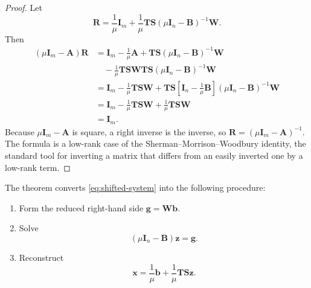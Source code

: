 \documentclass[11pt]{article}
\newcommand{\I}{\mathbf{I}}
\newcommand{\mat}[1]{\mathbf{#1}}
\newcommand{\vect}[1]{\mathbf{#1}}
\theoremstyle{definition}
\theoremstyle{remark}
\begin{document}
\begin{proof}
Let
\[
  \mat{R}
  =
  \frac{1}{\mu}\I_m
  +
  \frac{1}{\mu}
  \mat{T}\mat{S}
  (\mu\I_n-\mat{B})^{-1}\mat{W}.
\]
Then
\begin{align*}
  (\mu\I_m-\mat{A})\mat{R}
  &=\I_m-\frac{1}{\mu}\mat{A}
    +\mat{T}\mat{S}(\mu\I_n-\mat{B})^{-1}\mat{W}\\
  &\quad
    -\frac{1}{\mu}
     \mat{T}\mat{S}\mat{W}\mat{T}\mat{S}
     (\mu\I_n-\mat{B})^{-1}\mat{W}\\
  &=\I_m-\frac{1}{\mu}\mat{T}\mat{S}\mat{W}
    +\mat{T}\mat{S}
     \left[\I_n-\frac{1}{\mu}\mat{B}\right]
     (\mu\I_n-\mat{B})^{-1}\mat{W}\\
  &=\I_m-\frac{1}{\mu}\mat{T}\mat{S}\mat{W}
    +\frac{1}{\mu}\mat{T}\mat{S}\mat{W}\\
  &=\I_m.
\end{align*}
Because \(\mu\I_m-\mat{A}\) is square, a right inverse is the inverse, so \(\mat{R}=(\mu\I_m-\mat{A})^{-1}\). The formula is a low-rank case of the Sherman--Morrison--Woodbury identity, the standard tool for inverting a matrix that differs from an easily inverted one by a low-rank term.
\end{proof}

The theorem converts \cref{eq:shifted-system} into the following procedure:
\begin{enumerate}[label=\arabic*.]
  \item Form the reduced right-hand side \(\vect{g}=\mat{W}\vect{b}\).
  \item Solve
  \begin{equation}
    (\mu\I_n-\mat{B})\vect{z}=\vect{g}.
    \label{eq:reduced-shifted-solve}
  \end{equation}
  \item Reconstruct
  \begin{equation}
    \vect{x}
    =\frac{1}{\mu}\vect{b}
     +\frac{1}{\mu}\mat{T}\mat{S}\vect{z}.
    \label{eq:reconstruct-shifted-solve}
  \end{equation}
\end{enumerate}
\end{document}
